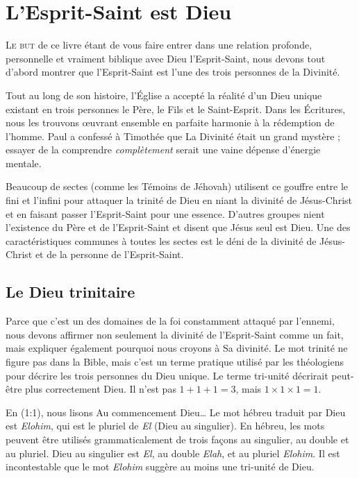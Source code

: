 \chapter{L'Esprit-Saint est Dieu}

\lettrine{L}{e but} de ce livre étant de vous faire entrer
 dans une relation profonde, personnelle et vraiment biblique avec
 Dieu l'Esprit-Saint, nous devons tout d'abord montrer que l'Esprit-Saint
 est l'une des trois personnes de la Divinité.

Tout au long de son histoire, l'Église a accepté la réalité d'un Dieu unique
 existant en trois personnes\frcolon{} le Père, le Fils et le Saint-Esprit.
 Dans les Écritures, nous les trouvons \oe{}uvrant ensemble en parfaite harmonie
 à la rédemption de l'homme.
 Paul a confessé à Timothée que La Divinité était un grand mystère ;
 essayer de la comprendre \emph{complètement} serait une vaine dépense
 d'énergie mentale.

Beaucoup de sectes (comme les Témoins de Jéhovah) utilisent
 ce gouffre entre le fini et l'infini pour attaquer la trinité de Dieu
 en niant la divinité de Jésus-Christ et en faisant passer l'Esprit-Saint
 pour une essence. D'autres groupes nient l'existence du Père et
 de l'Esprit-Saint et disent que Jésus seul est Dieu.
 Une des caractéristiques communes à toutes les sectes est le déni de la divinité
 de Jésus-Christ et de la personne de l'Esprit-Saint.

\section{Le Dieu trinitaire}

Parce que c'est un des domaines de la foi constamment attaqué par l'ennemi, nous devons
 affirmer non seulement la divinité de l'Esprit-Saint comme un fait,
 mais expliquer également pourquoi nous croyons à Sa divinité.
 Le mot \Og trinité \Fg{} ne figure pas dans la Bible, mais c'est un
 terme pratique utilisé par les théologiens pour décrire les trois personnes
 du Dieu unique.
 Le terme \Og tri-unité \Fg{} décrirait peut-être plus correctement Dieu.
 Il n'est pas $1 + 1 + 1 = 3$, mais $1 \times 1 \times 1 = 1$.

En (1:1), nous lisons\frcolon{}
 \Og Au commencement Dieu\dots{} \Fg{}
 Le mot hébreu traduit par \Og Dieu \Fg{} est \emph{Elohim}, qui est
 le pluriel de \emph{El} (Dieu au singulier).
 En hébreu, les mots peuvent être utilisés grammaticalement de trois
 façons\frcolon{} au singulier, au \Og double \Fg{} et au pluriel.
 \Og Dieu \Fg{} au singulier est \emph{El}, au double \emph{Elah},
 et au pluriel \emph{Elohim}.
 Il est incontestable que le mot \emph{Elohim} suggère au moins
 une tri-unité de Dieu.

